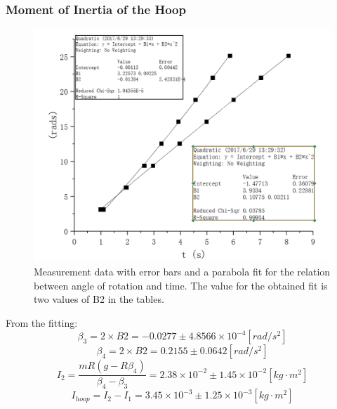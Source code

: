 \documentclass[12pt]{article}
\begin{document}
\subsubsection{Moment of Inertia of the Hoop}
\begin{figure}[H]
\centering
\includegraphics[width=1\linewidth]{P3.jpg}
\caption{Measurement data with error bars and a parabola fit for the relation between angle of rotation and time. The value for the obtained fit is two values of B2 in the tables.}
\end{figure}
From the fitting:
$$\beta_3=2\times{B2}=-0.0277\pm4.8566\times10^{-4}[rad/s^2]$$
$$\beta_4=2\times{B2}=0.2155\pm0.0642[rad/s^2]$$
$$I_2=\frac{mR(g-R\beta_4)}{\beta_4-\beta_3}=2.38\times10^{-2}\pm1.45\times10^{-2}[kg\cdot{m^2}]$$
$$I_{hoop}=I_2-I_1=3.45\times10^{-3}\pm1.25\times10^{-3}[kg\cdot{m^2}]$$
\end{document}
